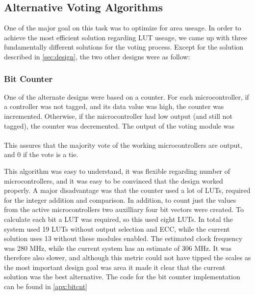 
\subsection{Alternative Voting Algorithms}
One of the major goal on this task was to optimize for area useage. In
order to achieve the most efficient solution regarding LUT useage, we
came up with three fundamentally different solutions for the voting
process. Except for the solution described in \autoref{sec:design},
the two other designs were as follow:

\subsubsection{Bit Counter}
One of the alternate designs were based on a counter. For each
microcontroller, if a controller was not tagged, and its data value
was high, the counter was incremented. Otherwise, if the
microcontroller had low output (and still not tagged), the counter was
decremented. The output of
the voting module was\\\hspace*{.3in}{\ttfamily if cnt > 0 then 1 else 0}\\
This assures that the majority vote of the working microcontrollers
are output, and 0 if the vote is a tie.

This algorithm was easy to understand, it was flexible regarding
number of microcontrollers, and it was easy to be convinced that the
design worked properly. A major disadvantage was that the counter used
a lot of LUTs, required for the integer addition and comparison. In
addition, to count just the values from the active microcontrollers
two auxilliary four bit vectors were created. To calculate each bit a
LUT was required, so this used eight LUTs. In total the system used 19
LUTs without output selection and ECC, while the current solution uses
13 without these modules enabled. The estimated clock frequency was
280 MHz, while the current system has an estimate of 306 MHz. It was
therefore also slower, and although this metric could not have tipped
the scales as the most important design goal was area it made it clear
that the current solution was the best alternative. The code for the
bit counter implementation can be found in \autoref{apx:bitcnt}

